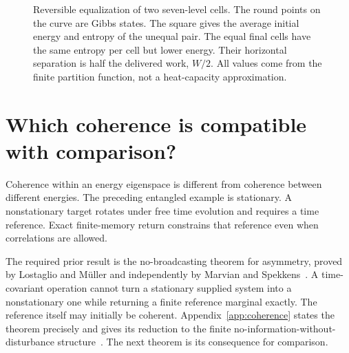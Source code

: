 \documentclass[11pt,a4paper]{article}
\newcommand{\engineUF}{0.5869973787823197}
\newcommand{\engineUOne}{0.9448818897637795}
\newcommand{\engineUTwo}{0.3329060611609595}
\newcommand{\engineSOne}{1.340246220950836}
\newcommand{\engineSTwo}{0.7491268308028816}
\newcommand{\engineSF}{1.044686525876859}
\newcommand{\engineUAvg}{0.6388939754623695}
\begin{document}
\begin{figure}[tb]
\caption{Reversible equalization of two seven-level cells. The round points on the curve are Gibbs states. The square gives the average initial energy and entropy of the unequal pair. The equal final cells have the same entropy per cell but lower energy. Their horizontal separation is half the delivered work, $W/2$. All values come from the finite partition function, not a heat-capacity approximation.}
\label{fig:engine}
\end{figure}

\section{Which coherence is compatible with comparison?}
Coherence within an energy eigenspace is different from coherence between different energies. The preceding entangled example is stationary. A nonstationary target rotates under free time evolution and requires a time reference. Exact finite-memory return constrains that reference even when correlations are allowed.

The required prior result is the no-broadcasting theorem for asymmetry, proved by Lostaglio and M\"uller and independently by Marvian and Spekkens~\cite{lostaglio,marvian}. A time-covariant operation cannot turn a stationary supplied system into a nonstationary one while returning a finite reference marginal exactly. The reference itself may initially be coherent. Appendix~\ref{app:coherence} states the theorem precisely and gives its reduction to the finite no-information-without-disturbance structure~\cite{koashi}. The next theorem is its consequence for comparison.
\end{document}
